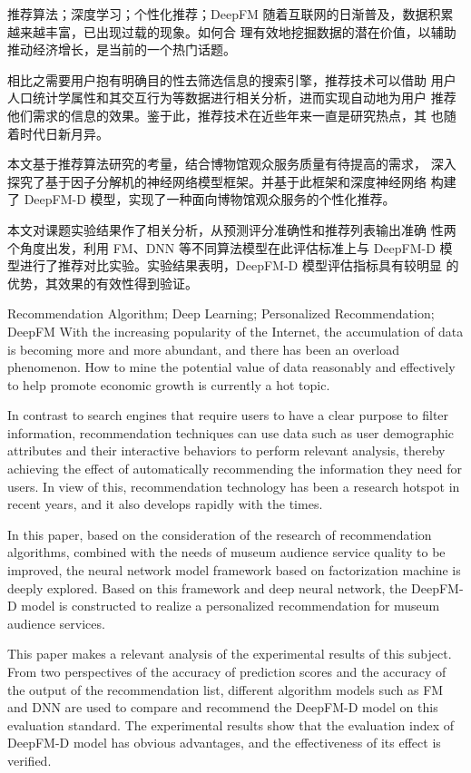 
\begin{cnabstract}{推荐算法；深度学习；个性化推荐；DeepFM}
  随着互联网的日渐普及，数据积累越来越丰富，已出现过载的现象。如何合
理有效地挖掘数据的潜在价值，以辅助推动经济增长，是当前的一个热门话题。

  相比之需要用户抱有明确目的性去筛选信息的搜索引擎，推荐技术可以借助
用户人口统计学属性和其交互行为等数据进行相关分析，进而实现自动地为用户
推荐他们需求的信息的效果。鉴于此，推荐技术在近些年来一直是研究热点，其
也随着时代日新月异。

本文基于推荐算法研究的考量，结合博物馆观众服务质量有待提高的需求，
深入探究了基于因子分解机的神经网络模型框架。并基于此框架和深度神经网络 构建了 DeepFM-D 模型，实现了一种面向博物馆观众服务的个性化推荐。

本文对课题实验结果作了相关分析，从预测评分准确性和推荐列表输出准确 
性两个角度出发，利用 FM、DNN 等不同算法模型在此评估标准上与 DeepFM-D 模型进行了推荐对比实验。实验结果表明，DeepFM-D 模型评估指标具有较明显 的优势，其效果的有效性得到验证。
\end{cnabstract}

\begin{enabstract}{Recommendation Algorithm; Deep Learning; Personalized Recommendation; DeepFM}
With the increasing popularity of the Internet, the accumulation of data is becoming more and more abundant, and there has been an overload phenomenon. How to mine the potential value of data reasonably and effectively to help promote economic growth is currently a hot topic.

In contrast to search engines that require users to have a clear purpose to filter information, recommendation techniques can use data such as user demographic attributes and their interactive behaviors to perform relevant analysis, thereby achieving the effect of automatically recommending the information they need for users. In view of this, recommendation technology has been a research hotspot in recent years, and it also develops rapidly with the times.

In this paper, based on the consideration of the research of recommendation algorithms, combined with the needs of museum audience service quality to be improved, the neural network model framework based on factorization machine is deeply explored. Based on this framework and deep neural network, the DeepFM-D model is constructed to realize a personalized recommendation for museum audience services.

This paper makes a relevant analysis of the experimental results of this subject. From two perspectives of the accuracy of prediction scores and the accuracy of the output of the recommendation list, different algorithm models such as FM and DNN are used to compare and recommend the DeepFM-D model on this evaluation standard. The experimental results show that the evaluation index of DeepFM-D model has obvious advantages, and the effectiveness of its effect is verified.

\end{enabstract}
